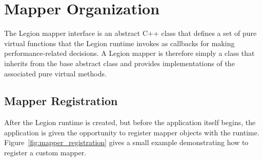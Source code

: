 \section{Mapper Organization}
\label{sec:mapping:org}

The Legion mapper interface is an abstract C++ class that defines a set of 
pure virtual functions that the Legion runtime invokes as callbacks
for making performance-related decisions. A Legion mapper is therefore 
simply a class that inherits from the base abstract class and provides 
implementations of the associated pure virtual methods.

\subsection{Mapper Registration}
\label{subsec:mapping:registration}

After the Legion runtime is created, but before the application itself
begins, the application is given the opportunity to register mapper objects 
with the runtime. Figure~\ref{fig:mapper_registration} gives a small
example demonstrating how to register a custom mapper.


